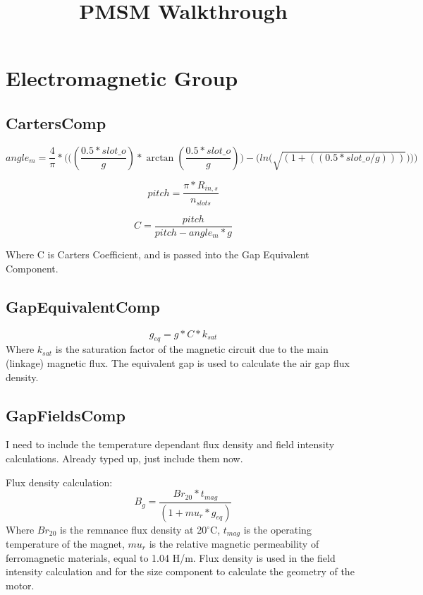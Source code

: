 \documentclass[10pt]{article}
\title{PMSM Walkthrough}
\author{ }
\begin{document}
\maketitle

\section{Electromagnetic Group}

\subsection{CartersComp}

\begin{equation}
    angle_{m} = \frac{4}{\pi}*\Bigg(\bigg((\frac{0.5 * slot\_o}{g})*\arctan(\frac{0.5*slot\_o}{g})\bigg) - \bigg(ln\Big(\sqrt{(1+((0.5*slot\_o/g)))}\Big)\bigg)\Bigg)
\end{equation}


\begin{equation}
    pitch = \frac{\pi*R_{in,s}}{n_{slots}}
\end{equation}

\begin{equation}
    C =\frac{pitch}{pitch - angle_{m} * g}
\end{equation}

Where C is Carters Coefficient, and is passed into the Gap Equivalent Component.

\subsection{GapEquivalentComp}

\begin{equation}
    g_{eq} = g * C * k_{sat}
\end{equation}
Where $k_{sat}$ is the saturation factor of the magnetic circuit due to the main (linkage) magnetic flux. The equivalent gap is used to calculate the air gap flux density.

\subsection{GapFieldsComp}
I need to include the temperature dependant flux density and field intensity calculations. Already typed up, just include them now.

Flux density calculation:
\begin{equation}
    B_{g} = \frac{Br_{20} * t_{mag}}{(1+mu_{r}*g_{eq})}
\end{equation}
Where $Br_{20}$ is the remnance flux density at 20$^\circ$C, $t_{mag}$ is the operating temperature of the magnet, $mu_{r}$ is the relative magnetic permeability of ferromagnetic materials, equal to 1.04 H/m. Flux density is used in the field intensity calculation and for the size component to calculate the geometry of the motor.
\end{document}

